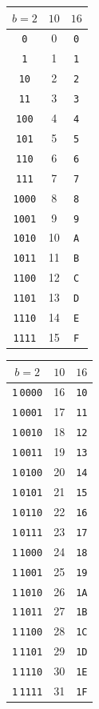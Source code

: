\begin{multicols}{3}\small\centering
\begin{tabular}{ccc}
$b=2$ &  $10$ & $16$ \\
\hline
\texttt{0} & 0 & \texttt{0} \\
\texttt{1} & 1 & \texttt{1} \\
\texttt{10} & 2 & \texttt{2} \\
\texttt{11} & 3 & \texttt{3} \\
\texttt{100} & 4 & \texttt{4} \\
\texttt{101} & 5 & \texttt{5} \\
\texttt{110} & 6 & \texttt{6} \\
\texttt{111} & 7 & \texttt{7} \\
\texttt{1000} & 8 & \texttt{8} \\
\texttt{1001} & 9 & \texttt{9} \\
\texttt{1010} & 10 & \texttt{A} \\
\texttt{1011} & 11 & \texttt{B} \\
\texttt{1100} & 12 & \texttt{C} \\
\texttt{1101} & 13 & \texttt{D} \\
\texttt{1110} & 14 & \texttt{E} \\
\texttt{1111} & 15 & \texttt{F} \\
\end{tabular}

\begin{tabular}{ccc}
$b=2$ &  $10$ & $16$ \\
\hline
\texttt{1}\,\texttt{0000} & 16 & \texttt{10} \\
\texttt{1}\,\texttt{0001} & 17 & \texttt{11} \\
\texttt{1}\,\texttt{0010} & 18 & \texttt{12} \\
\texttt{1}\,\texttt{0011} & 19 & \texttt{13} \\
\texttt{1}\,\texttt{0100} & 20 & \texttt{14} \\
\texttt{1}\,\texttt{0101} & 21 & \texttt{15} \\
\texttt{1}\,\texttt{0110} & 22 & \texttt{16} \\
\texttt{1}\,\texttt{0111} & 23 & \texttt{17} \\
\texttt{1}\,\texttt{1000} & 24 & \texttt{18} \\
\texttt{1}\,\texttt{1001} & 25 & \texttt{19} \\
\texttt{1}\,\texttt{1010} & 26 & \texttt{1A} \\
\texttt{1}\,\texttt{1011} & 27 & \texttt{1B} \\
\texttt{1}\,\texttt{1100} & 28 & \texttt{1C} \\
\texttt{1}\,\texttt{1101} & 29 & \texttt{1D} \\
\texttt{1}\,\texttt{1110} & 30 & \texttt{1E} \\
\texttt{1}\,\texttt{1111} & 31 & \texttt{1F} \\
\end{tabular}


\end{multicols}
